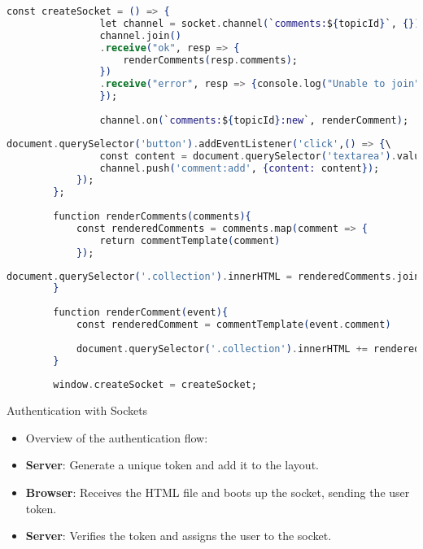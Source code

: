 \documentclass[aspectratio=169, table]{beamer}
\begin{document}
	\begin{frame}[fragile]{}
		\begin{lstlisting}[language=Elixir]
			const createSocket = () => {
				let channel = socket.channel(`comments:${topicId}`, {})
				channel.join()
				.receive("ok", resp => {
					renderComments(resp.comments);
				})
				.receive("error", resp => {console.log("Unable to join", resp);
				});
				
				channel.on(`comments:${topicId}:new`, renderComment);
		\end{lstlisting}
	\end{frame}
	
	\begin{frame}[fragile]{}
		\begin{lstlisting}[language=Elixir]
			document.querySelector('button').addEventListener('click',() => {\
				const content = document.querySelector('textarea').value;
				channel.push('comment:add', {content: content});
			});
		};
		
		function renderComments(comments){
			const renderedComments = comments.map(comment => {
				return commentTemplate(comment)
			});
	\end{lstlisting}
	\end{frame}
	
	\begin{frame}[fragile]{}
		\begin{lstlisting}[language=Elixir]
			document.querySelector('.collection').innerHTML = renderedComments.join('');
		}
		
		function renderComment(event){
			const renderedComment = commentTemplate(event.comment)
			
			document.querySelector('.collection').innerHTML += renderedComment;
		}
		
		window.createSocket = createSocket;
	\end{lstlisting}
	\end{frame}
	
	\begin{frame}{Authentication with Sockets}
		\begin{itemize}
			\item Overview of the authentication flow:
			\item \textbf{Server}: Generate a unique token and add it to the layout.
			\item \textbf{Browser}: Receives the HTML file and boots up the socket, sending the user token.
			\item \textbf{Server}: Verifies the token and assigns the user to the socket.
		\end{itemize}
	\end{frame}
	
\end{document}

